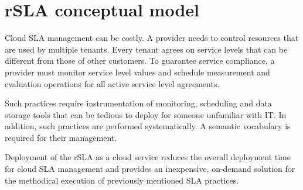 \section{rSLA conceptual model}

Cloud SLA management can be costly. A provider needs to control resources that are used by multiple tenants. Every tenant agrees on service levels that can be different from those of other customers. To guarantee service compliance, a provider must monitor service level values and schedule measurement and evaluation operations for all active service level agreements. 

Such practices require instrumentation of monitoring, scheduling and data storage tools that can be tedious to deploy for someone unfamiliar with IT. In addition, such practices are performed systematically.  A semantic vocabulary is required for their management.

Deployment of the rSLA as a cloud service reduces the overall deployment time for cloud SLA management and provides an inexpensive, on-demand solution for the methodical execution of previously mentioned SLA practices. 